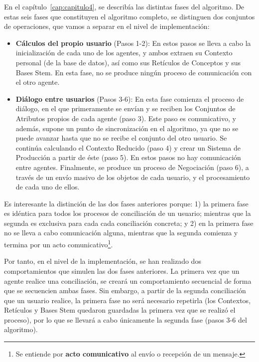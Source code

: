 En el capítulo~\ref{cap:capitulo4}, se describía las distintas fases del algoritmo. De estas seis fases que constituyen el algoritmo completo, se distinguen dos conjuntos de operaciones, que vamos a separar en el nivel de implementación:

\begin{itemize}
	\item {\bf Cálculos del propio usuario} (Pasos 1-2): En estos pasos se lleva a cabo la inicialización de cada uno de los agentes, y ambos extraen su Contexto personal (de la base de datos), así como sus Retículos de Conceptos y sus Bases Stem. En esta fase, no se produce ningún proceso de comunicación con el otro agente.
	\item {\bf Diálogo entre usuarios} (Pasos 3-6): En esta fase comienza el proceso de diálogo, en el que primeramente se envían y se reciben los Conjuntos de Atributos propios de cada agente (paso 3). Este paso es comunicativo, y además, supone un punto de sincronización en el algoritmo, ya que no se puede avanzar hasta que no se recibe el conjunto del otro usuario. Se continúa calculando el Contexto Reducido (paso 4) y crear un Sistema de Producción a partir de éste (paso 5). En estos pasos no hay comunicación entre agentes. Finalmente, se produce un proceso de Negociación (paso 6), a través de un envío masivo de los objetos de cada usuario, y el procesamiento de cada uno de ellos.
\end{itemize}

Es interesante la distinción de las dos fases anteriores porque: 1) la primera fase es idéntica para todos los procesos de conciliación de un usuario; mientras que la segunda es exclusiva para cada cada conciliación concreta; y 2) en la primera fase no se lleva a cabo comunicación alguna, mientras que la segunda comienza y termina por un acto comunicativo\footnote{Se entiende por {\bf acto comunicativo} al envío o recepción de un mensaje.}.

Por tanto, en el nivel de la implementación, se han realizado dos comportamientos que simulen las dos fases anteriores. La primera vez que un agente realice una conciliación, se creará un comportamiento secuencial de forma que se secuencien ambas fases. Sin embargo, a partir de la segunda conciliación que un usuario realice, la primera fase no será necesario repetirla (los Contextos, Retículos y Bases Stem quedaron guardadas la primera vez que se realizó el proceso), por lo que se llevará a cabo únicamente la segunda fase (pasos 3-6 del algoritmo).


